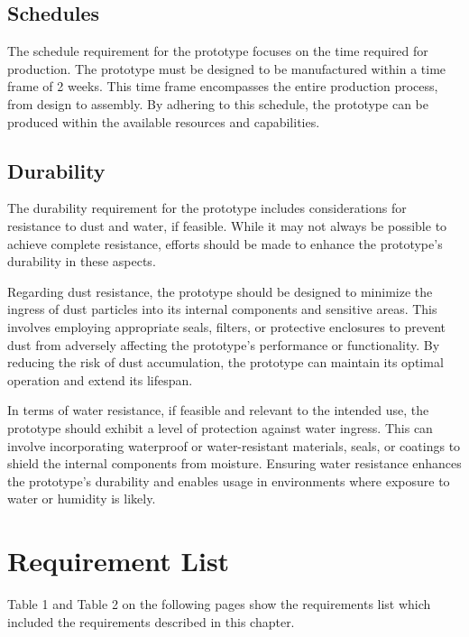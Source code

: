 \subsection{Schedules}
The schedule requirement for the prototype focuses on the time required for production. The prototype must be designed to be manufactured within a time frame of 2 weeks. This time frame encompasses the entire production process, from design to assembly. By adhering to this schedule, the prototype can be produced within the available resources and capabilities.

\subsection{Durability}
The durability requirement for the prototype includes considerations for resistance to dust and water, if feasible. While it may not always be possible to achieve complete resistance, efforts should be made to enhance the prototype's durability in these aspects.

Regarding dust resistance, the prototype should be designed to minimize the ingress of dust particles into its internal components and sensitive areas. This involves employing appropriate seals, filters, or protective enclosures to prevent dust from adversely affecting the prototype's performance or functionality. By reducing the risk of dust accumulation, the prototype can maintain its optimal operation and extend its lifespan.

In terms of water resistance, if feasible and relevant to the intended use, the prototype should exhibit a level of protection against water ingress. This can involve incorporating waterproof or water-resistant materials, seals, or coatings to shield the internal components from moisture. Ensuring water resistance enhances the prototype's durability and enables usage in environments where exposure to water or humidity is likely.

\section{Requirement List}
Table 1 and Table 2 on the following pages show the requirements list which included the requirements described in this chapter.

